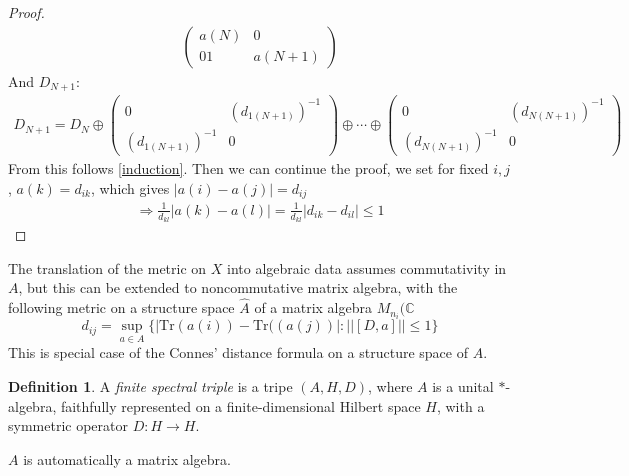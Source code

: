 \documentclass[a4paper]{article}
\theoremstyle{definition}
\newtheorem{definition}{Definition}
\theoremstyle{definition}
\theoremstyle{definition}
\theoremstyle{theorem}
\theoremstyle{theorem}
\theoremstyle{definition}
\begin{document}
\begin{proof}
\begin{align}
        \begin{pmatrix}
            a(N) & 0 \\
            0  1 & a(N+1)
        \end{pmatrix}
    \end{align}
    And $D_{N+1}$:
    \begin{align}
        D_{N+1} = D_N
        \oplus
        \begin{pmatrix}
            0 & (d_{1(N+1)})^{-1} \\
            (d_{1(N+1)})^{-1}   & 0
        \end{pmatrix}
        \oplus \cdots \oplus
        \begin{pmatrix}
            0 & (d_{N(N+1)})^{-1} \\
            (d_{N(N+1)})^{-1}   & 0
        \end{pmatrix}
    \end{align}
    From this follows \ref{induction}.
    Then we can continue the proof, we set for fixed $i, j$, $a(k) = d_{ik}$, which gives
    $|a(i) - a(j)| = d_{ij}$
    \begin{align}
        \Rightarrow  \frac{1}{d_{kl}} | a(k) - a(l) | =  \frac{1}{d_{kl}} | d_{ik} - d_{il} | \leq 1
    \end{align}
\end{proof}

The translation of the metric on $X$ into algebraic data assumes commutativity in $A$, but this can be
extended to noncommutative matrix algebra, with the following metric on a structure space $\hat{A}$
of a matrix algebra $M_{n_i}(\mathbb{C}$
\begin{equation}
    d_{ij} = \sup_{a\in A}\big\{|\text{Tr}(a(i)) - \text{Tr}((a(j))|: ||[D, a]|| \leq 1\big\}
\end{equation}
This is special case of the Connes' distance formula on a structure space of $A$.

\begin{definition}
    A \textit{finite spectral triple} is a tripe $(A, H, D)$, where $A$ is a unital $*$-algebra,
    faithfully represented on a finite-dimensional Hilbert space $H$, with a symmetric operator
    $D: H \rightarrow H$.
\end{definition}
$A$ is automatically a matrix algebra.
\end{document}
